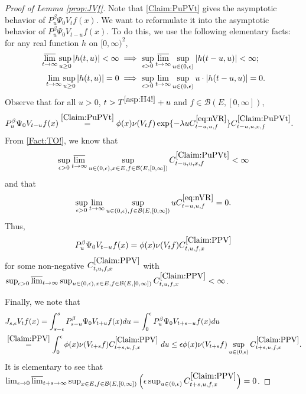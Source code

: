 \documentclass[12pt,a4paper]{amsart}
\numberwithin{equation}{section}
\theoremstyle{plain}
\theoremstyle{definition}
\theoremstyle{remark}
\begin{document}
\begin{proof}[Proof of Lemma \ref{prop:JVf}]
	Note that \eqref{Claim:PuPVt} gives the asymptotic behavior of $P_u^\beta \Psi_0 V_t f(x)$.
	We want to reformulate it into the asymptotic behavior  of $P_u^\beta \Psi_0 V_{t-u} f(x)$.	
	To do this, we use the following elementary facts: for any real function $h$ on $[0,\infty)^2$,
	\begin{align}\label{Fact:TO!}
	\varlimsup_{t\to \infty} \sup_{u\geq 0} |h(t,u)| < \infty & \implies \sup_{\epsilon > 0} \varlimsup_{t\to \infty} \sup_{u \in (0,\epsilon)} |h(t-u,u)| < \infty;
	\\ 	\lim_{t\to \infty} \sup_{u \geq 0} |h(t,u)| = 0 & \implies \sup_{\epsilon > 0} \lim_{t\to \infty} \sup_{u \in (0,\epsilon)} u\cdot |h(t-u,u)| = 0.
	\end{align}
	Observe that for all $u>0$, $t> T^{\eqref{asp:H4!}} + u$ and $f \in \mathcal B(E,[0,\infty])$,
	\begin{align}
	& P_u^\beta \Psi_0 V_{t-u} f(x)
	\overset{\eqref{Claim:PuPVt}}= \phi(x) \nu(V_{t}f) \exp\{-\lambda u C^{\eqref{eq:nVR}}_{t-u,u,f} \} C^{\eqref{Claim:PuPVt}}_{t-u,u,x,f}.
	\end{align}
	From \eqref{Fact:TO!}, we know that
	\[
	\sup_{\epsilon > 0}\varlimsup_{t\to \infty}
	\sup_{u\in (0,\epsilon), x\in E, f \in \mathcal B(E,[0,\infty])}
	C^{\eqref{Claim:PuPVt}}_{t-u,u,x,f} < \infty
	\]
	and that
	\[
	\sup_{\epsilon > 0}\lim_{t\to \infty}
	\sup_{u\in (0,\epsilon), f \in \mathcal B(E,[0,\infty])}
	uC^{\eqref{eq:nVR}}_{t-u,u,f} =0.
	\]
	Thus,
\begin{equation}
	\label{Claim:PPV}
	P_u^\beta \Psi_0 V_{t-u} f(x) = \phi(x)\nu(V_tf) C^{\eqref{Claim:PPV}}_{t,u,f,x}
\end{equation}
	for some non-negative $C^{\eqref{Claim:PPV}}_{t, u,f,x}$ with
	$\sup_{\epsilon > 0} \varlimsup_{t\to \infty}
	\sup_{u \in (0,\epsilon), x\in E, f \in \mathcal B(E,[0,\infty])}
	C^{\eqref{Claim:PPV}}_{t,u,f,x} < \infty$.

	Finally, we note that
	\begin{align}
	&J_{s,\epsilon}V_tf(x) = \int_{s-\epsilon}^s P_{s-u}^\beta \Psi_0 V_{t+u} f(x)du
	= \int_0^\epsilon P_u^\beta \Psi_0 V_{t+s - u}f(x) du
	\\& \overset{\eqref{Claim:PPV}}= \int_0^\epsilon \phi(x) \nu(V_{t+s}f) C^{\eqref{Claim:PPV}}_{t+s,u,f,x}~du
	\leq \epsilon \phi(x)\nu(V_{t+s}f) \sup_{u\in (0,\epsilon)} C^{\eqref{Claim:PPV}}_{t+s,u,f,x}.
	\end{align}
	It is elementary to see that $\lim_{\epsilon \to 0}\varlimsup_{t+s \to \infty}
	\sup_{x\in E, f \in \mathcal B(E,[0,\infty])}
	\Big(\epsilon \sup_{u\in (0,\epsilon)} C^{\eqref{Claim:PPV}}_{t+s,u,f,x}\Big) = 0$.
\end{proof}
\end{document}
